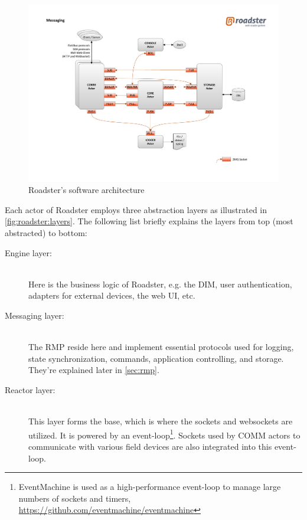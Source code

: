 \begin{figure}[]
	\includegraphics[trim=4cm 2cm 3.5cm 2.8cm, clip=true, width=\textwidth]{img/roadster_arch.pdf}
	\caption{Roadster's software architecture}
	\label{fig:roadster:arch}
\end{figure}

Each actor of Roadster employs three abstraction layers
as illustrated in \autoref{fig:roadster:layers}.  The following
list briefly explains the layers from top (most abstracted) to bottom:

\begin{description}
	\item [Engine layer:]\hfill\\
		Here is the business logic of Roadster, e.g. the \gls{DIM},
		user authentication, adapters for external devices, the web
		\gls{UI}, etc.

	\item [Messaging layer:]\hfill\\
		The \gls{RMP} reside here and implement essential protocols used
		for logging, state synchronization, commands, application controlling,
		and storage. They're explained later in \autoref{sec:rmp}.

	\item [Reactor layer:]\hfill\\
		This layer forms the base, which is where the \zmq sockets and
		\glspl{websocket} are utilized. It is powered by an
		event-loop\footnote{EventMachine is used as a high-performance event-loop to
		manage large numbers of sockets and timers,
		\url{https://github.com/eventmachine/eventmachine}}. Sockets used by COMM actors
		to communicate with various field devices are also integrated into this
		event-loop.

\end{description}

